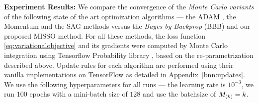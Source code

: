 \documentclass[11pt]{article}
\theoremstyle{t}
\begin{document}
%


\textbf{Experiment Results:}
We compare the convergence of the \textit{Monte Carlo variants} of the following state of the art optimization algorithms --- the ADAM \citep{kingma:adam}, the Momentum \citep{sutskever2013importance} and the SAG \citep{schmidt2017minimizing} methods versus the \textit{Bayes by Backprop} (BBB) \citep{blundell2015weight} and our proposed MISSO method.
For all these methods, the loss function \eqref{eq:variationalobjective} and its gradients were computed by Monte Carlo integration using Tensorflow Probability library \citep{dillon2017tfp}, based on the re-parametrization described above.
Update rules for each algorithm are performed using their vanilla implementations on TensorFlow \citep{tensorflow2015-whitepaper} as detailed in Appendix~\ref{bnn:updates}.
We use the following hyperparameters for all runs --- the learning rate is $10^{-3}$, we run $100$ epochs with a mini-batch size of $128$ and use the batchsize of $\Bsize{k} = k$.\vspace{-.2cm}
\end{document}
